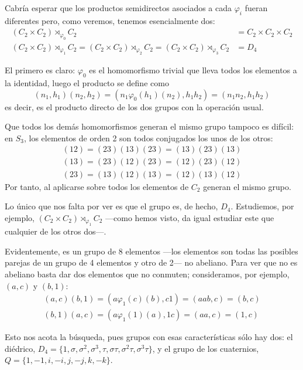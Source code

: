 \documentclass[a4paper, 11pt]{article}
\begin{document}
\begin{solucion}
      Cabría esperar que los productos semidirectos asociados a cada $\varphi_i$ fueran diferentes pero, como veremos, tenemos esencialmente dos:
      \begin{align*}
          (C_2 \times C_2) \rtimes_{\varphi_0} C_2& = C_2 \times C_2 \times C_2 \\
          (C_2 \times C_2) \rtimes_{\varphi_1} C_2 = (C_2 \times C_2) \rtimes_{\varphi_2} C_2 = (C_2 \times C_2) \rtimes_{\varphi_3} C_2 &= D_4
      \end{align*}

      El primero es claro: $\varphi_0$ es el homomorfismo trivial que lleva todos los elementos a la identidad, luego el producto se define como
      \[
      (n_1,h_1)(n_2,h_2) = (n_1\varphi_0(h_1)(n_2),h_1 h_2) = (n_1 n_2,h_1 h_2)
      \]
      es decir, es el producto directo de los dos grupos con la operación usual.

      Que todos los demás homomorfismos generan el mismo grupo tampoco es difícil: en $S_3$, los elementos de orden 2 son todos conjugados los unos de los otros:
      \begin{align*}
          (12) = (23)(13)(23) = (13)(23)(13) \\
          (13) = (23)(12)(23) = (12)(23)(12) \\
          (23) = (13)(12)(13) = (12)(13)(12)
      \end{align*}
      Por tanto, al aplicarse sobre todos los elementos de $C_2$ generan el mismo grupo.

      Lo único que nos falta por ver es que el grupo es, de hecho, $D_4$. Estudiemos, por ejemplo, $(C_2 \times C_2) \rtimes_{\varphi_1} C_2$ ---como hemos visto, da igual estudiar este que cualquier de los otros dos---.

      Evidentemente, es un grupo de 8 elementos ---los elementos son todas las posibles parejas de un grupo de 4 elementos y otro de 2--- no abeliano. Para ver que no es abeliano basta dar dos elementos que no conmuten; consideramos, por ejemplo, $(a,c)$ y $(b,1)$:
      \begin{align*}
          (a,c)(b,1) = (a\varphi_1(c)(b),c1) = (aab, c) = (b,c) \\
          (b,1)(a,c) = (a\varphi_1(1)(a),1c) = (aa, c) = (1,c)
      \end{align*}

      Esto nos acota la búsqueda, pues grupos con esas características sólo hay dos: el diédrico, $D_4 = \{1,\sigma,\sigma^2,\sigma^3,\tau,\sigma\tau,\sigma^2\tau,\sigma^3\tau\}$, y el grupo de los cuaternios, $Q = \{1,-1,i,-i,j,-j,k,-k\}$.


\end{solucion}
\end{document}
